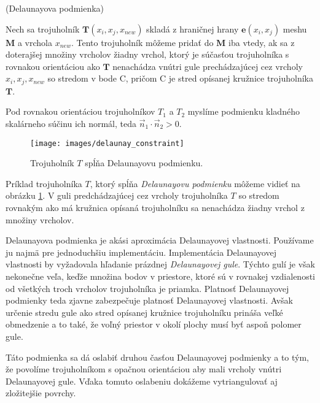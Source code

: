 \begin{definition}
    (Delaunayova podmienka)
    \label{def:delaunay_constraint}

    Nech sa trojuholník $\mathbf{T}(x_i, x_j, x_{new})$ skladá z hraničnej hrany $\mathbf{e}(x_i, x_j)$ 
    meshu $\mathbf{M}$ a vrchola $x_{new}$. Tento trojuholník môžeme pridať do 
    $\mathbf{M}$ iba vtedy, ak sa z doterajšej 
    množiny vrcholov žiadny vrchol, ktorý je súčasťou trojuholníka s rovnakou orientáciou ako 
    $\mathbf{T}$ nenachádza vnútri gule prechádzajúcej cez vrcholy $x_i, x_j, x_{new}$ so stredom 
    v bode C, pričom C je stred opísanej kružnice trojuholníka $\mathbf{T}$.
\end{definition}

    Pod rovnakou orientáciou 
    trojuholníkov $T_1$ a $T_2$ myslíme podmienku kladného skalárneho súčinu ich normál, teda 
    $\vec{n}_1 \cdot \vec{n}_2 > 0$.

\begin{figure}
    \centerline{\texttt{[image: images/delaunay\_constraint]}}
    \caption[Trojuholník $T$ spĺňajúci Delaunayovu podmienku]
    {\cite{hilton1996marching} Trojuholník $T$ spĺňa Delaunayovu podmienku.}
    \label{obr:delaunay_constraint}
\end{figure}

Príklad trojuholníka $T$, ktorý spĺňa \textit{Delaunayovu podmienku} môžeme vidieť na obrázku 
\ref{obr:delaunay_constraint}. V guli predchádzajúcej cez vrcholy trojuholníka $T$ so stredom 
rovnakým ako má kružnica opísaná trojuholníku sa nenachádza žiadny vrchol z množiny vrcholov.

Delaunayova podmienka je akási aproximácia Delaunayovej vlastnosti. Používame ju najmä pre jednoduchšiu
implementáciu. Implementácia Delaunayovej vlastnosti by vyžadovala
hľadanie prázdnej \textit{Delaunayovej gule}. Týchto gulí je však nekonečne veľa, keďže množina
bodov v priestore, ktoré sú v rovnakej vzdialenosti od všetkých troch vrcholov trojuholníka je priamka.
Platnosť Delaunayovej podmienky teda zjavne zabezpečuje platnosť Delaunayovej vlastnosti.
Avšak určenie stredu gule ako stred opísanej kružnice trojuholníku prináša veľké obmedzenie a to také,
že voľný priestor v okolí plochy musí byť aspoň polomer gule. 

Táto podmienka sa dá oslabiť druhou časťou
Delaunayovej podmienky a to tým, že povolíme trojuholníkom s opačnou orientáciou aby mali vrcholy vnútri
Delaunayovej gule. Vďaka tomuto oslabeniu dokážeme vytriangulovať aj zložitejšie povrchy.


